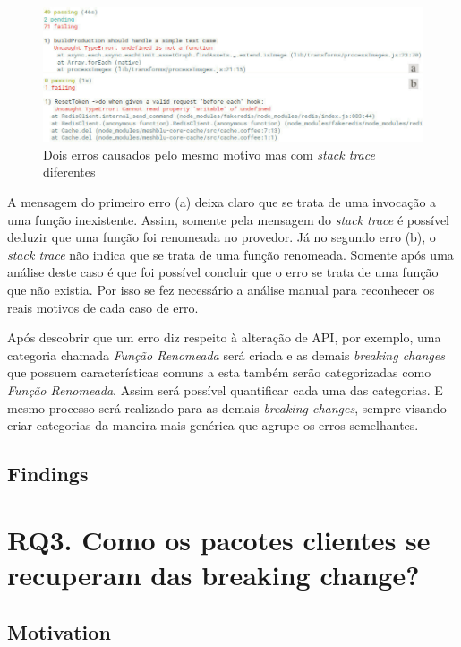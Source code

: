 \begin{figure}[!h]
    \centering
    \includegraphics[scale=0.5]{figuras/error_category.jpeg}
    \caption{Dois erros causados pelo mesmo motivo mas com \textit{stack trace} diferentes}
    \label{fig:error_category}
\end{figure}

A mensagem do primeiro erro (a) deixa claro que se trata de uma invocação a uma função inexistente. Assim, somente pela mensagem do \textit{stack trace} é possível deduzir que uma função foi renomeada no provedor. Já no segundo erro (b), o \textit{stack trace} não indica que se trata de uma função renomeada. Somente após uma análise deste caso é que foi possível concluir que o erro se trata de uma função que não existia. Por isso se fez necessário a análise manual para reconhecer os reais motivos de cada caso de erro.

Após descobrir que um erro diz respeito à alteração de \gls{API}, por exemplo, uma categoria chamada \textit{Função Renomeada} será criada e as demais \textit{breaking changes} que possuem características comuns a esta também serão categorizadas como \textit{Função Renomeada}. Assim será possível quantificar cada uma das categorias. E mesmo processo será realizado para as demais \textit{breaking changes}, sempre visando criar categorias da maneira mais genérica que agrupe os erros semelhantes.

\subsection{Findings}
\label{fin:rq2}

\section{RQ3. Como os pacotes clientes se recuperam das breaking change?}
\label{sec:rq3}

\subsection{Motivation}
\label{mot:rq3}


